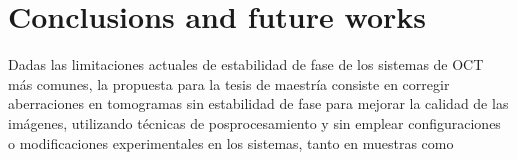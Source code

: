 \newpage
{}
\chapter{Conclusions and future works}\label{chap:conclusions}

Dadas las limitaciones actuales de estabilidad de fase de los sistemas de OCT más comunes, la propuesta para la tesis de maestría consiste en corregir aberraciones en tomogramas sin estabilidad de fase para mejorar la calidad de las imágenes, utilizando técnicas de posprocesamiento y sin emplear configuraciones o modificaciones experimentales en los sistemas, tanto en muestras como